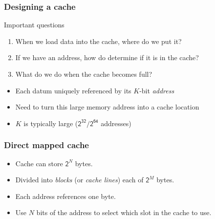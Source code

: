 \documentclass[dvipsnames,presentation,aspectratio=169,14pt]{beamer}
\begin{document}
\begin{frame}
  \frametitle{Designing a cache}
  \begin{block}{Important questions}
    \begin{enumerate}[itemsep=6pt]
    \item When we load data into the cache, where do we put it?
    \item If we have an address, how do determine if it is in the
      cache?
    \item What do we do when the cache becomes full?
    \end{enumerate}
  \end{block}

  \vskip 11pt

  \begin{itemize}[itemsep=4pt]
  \item Each datum uniquely referenced by its $K$-bit \emph{address}
  \item Need to turn this large memory address into a cache location
  \item $K$ is typically large ($\mathsf{2^{32}/2^{64}}$ addresses)
  \end{itemize}
\end{frame}

\begin{frame}
  \frametitle{Direct mapped cache}
  \begin{itemize}
  \item Cache can store $\mathsf 2^N$ bytes.
  \item Divided into \emph{blocks} (or \emph{cache lines}) each of $\mathsf 2^M$ bytes.
  \item Each address references one byte.
  \item Use $N$ bits of the address to select which slot
    in the cache to use.
  \end{itemize}

  \vskip 11pt

\end{frame}
\end{document}
